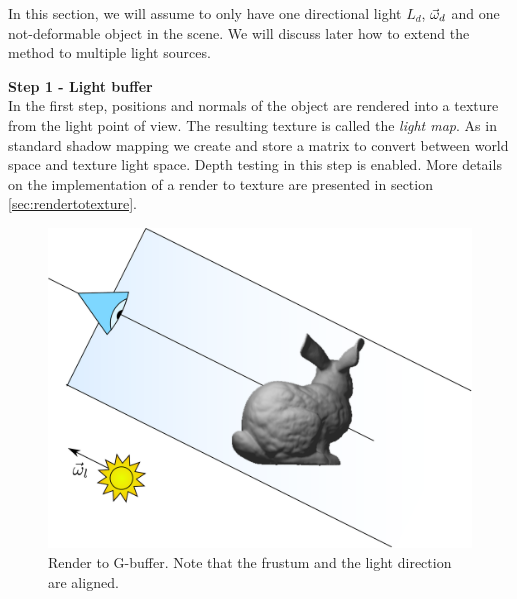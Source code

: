In this section, we will assume to only have one directional light $L_d$, $\vec{\omega}_d$ and one not-deformable object in the scene. We will discuss later how to extend the method to multiple light sources.

\textbf{Step 1 - Light buffer} \\

In the first step, positions and normals of the object are rendered into a texture from the light point of view. The resulting texture is called the \emph{light map}. As in standard shadow mapping we create and store a matrix to convert between world space and texture light space. Depth testing in this step is enabled. More details on the implementation of a render to texture are presented in section \ref{sec:rendertotexture}.

\begin{figure}[!ht]
\centering
\includegraphics[width=0.8 \linewidth]{images/method/step1.pdf}
\caption{Render to G-buffer. Note that the frustum and the light direction are aligned.}
\label{fig:step1}
\end{figure} 


